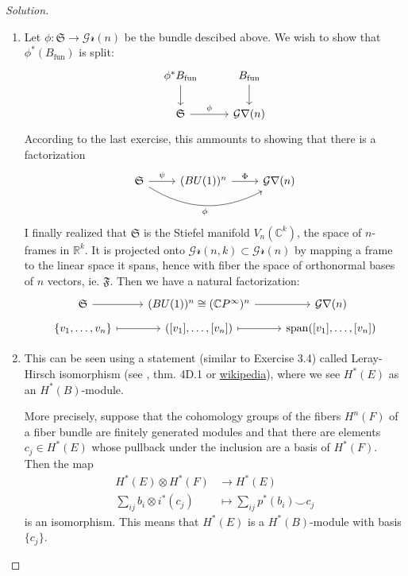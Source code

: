 \begin{proof}[Solution]\leavevmode
	\begin{enumerate}[label=\alph*.]
		\item Let $\phi :\mathfrak{S}\to \mathcal{Gr}(n)$ be the bundle descibed above. We wish to show that $\phi^{*}(B_{\operatorname{fun}})$ is split:
\[\begin{tikzcd}
	\phi^*B_{\operatorname{fun}}\arrow[d]&B_{\operatorname{fun}}\arrow[d]\\
	\mathfrak{S}\arrow[r,"\phi "]&\mathcal{Gr}(n)
\end{tikzcd}\]
			According to the last exercise, this ammounts to showing that there is a factorization
			\[\begin{tikzcd}
				\mathfrak{S}\arrow[rr,bend right, swap, "\phi "]\arrow[r,"\psi"]&(BU(1))^n\arrow[r,"\Phi"]&\mathcal{Gr}(n)
			\end{tikzcd}\]
		I finally realized that $\mathfrak{S}$ is the Stiefel manifold $V_n(\mathbb{C}^k)$, the space of $n$-frames in $\mathbb{R}^{k}$. It is projected onto $\mathcal{Gr}(n,k)\subset \mathcal{Gr}(n)$ by mapping a frame to the linear space it spans, hence with fiber the space of orthonormal bases of $n$ vectors, ie. $\mathfrak{F}$. Then we have a natural factorization:
		\[\begin{tikzcd}[ row sep =tiny]
			\mathfrak{S}\arrow[r]&(BU(1))^n\cong (\mathbb{C}P^{\infty})^n\arrow[r]&\mathcal{Gr}(n)\\
			\{v_1,\ldots,v_n\} \arrow[maps to,r ]&([v_1],\ldots,[v_n])\arrow[r,maps to]&\operatorname{span}([v_1],\ldots,[v_n])
		\end{tikzcd}\]
		
		\item This can be seen using a statement (similar to Exercise 3.4) called Leray-Hirsch isomorphism (see \cite{hatcher}, thm. 4D.1 or \href{https://en.wikipedia.org/wiki/Leray%E2%80%93Hirsch_theorem#The_Leray%E2%80%93Hirsch_isomorphism}{wikipedia}), where we see $H^{*}(E)$ as an $H^{*}(B)$-module.

				More precisely, suppose that the cohomology groups of the fibers $H^{n}(F)$ of a fiber bundle are finitely generated modules and that there are elements $c_j\in H^{*}(E)$ whose pullback under the inclusion are a basis of $H^*(F)$. Then the map
				\begin{align*}
					H^{*}(E)\otimes H^{*}(F) &\longrightarrow H^{*}(E) \\
					\sum_{ij}b_i\otimes i^*(c_j) &\longmapsto \sum_{ij}p^* (b_{i}) \smile c_j
				\end{align*}
			is an isomorphism. This means that $ H^{*}(E)$ is a $H^{*}(B)$-module with basis $\{c_j\}$.


\end{enumerate}
\end{proof}
